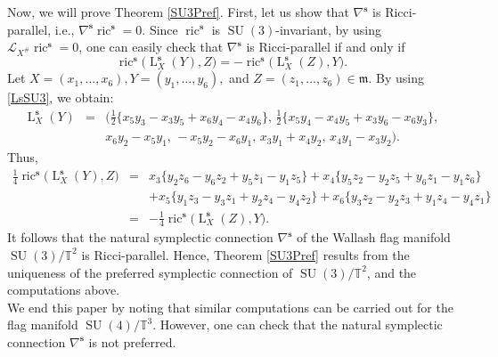 \documentclass[preprint,12pt,1p]{elsarticle}
\theoremstyle{plain}
\theoremstyle{definition}
\newcommand{\n}{\nabla}
\newcommand{\ns}{\n^\mathbf{s}}
\newcommand{\ls}{\operatorname{L}^\mathbf{s}}
\newcommand{\ric}{\operatorname{ric}}
\numberwithin{equation}{section}
\newcommand{\SU}{\operatorname{SU}}
\begin{document}
Now, we will prove Theorem \ref{SU3Pref}. First, let us show that $\ns$ is Ricci-parallel, i.e., $\ns\ric^\mathbf{s}=0$. Since $\ric^\mathbf{s}$ is $\SU(3)$-invariant, by using $\mathcal{L}_{X^\#}\ric^\mathbf{s}=0$, one can easily check that $\ns$ is Ricci-parallel if and only if
\begin{equation*}\label{PerfSU3-2-}
\ric^\mathbf{s}\big(\ls_X(Y),Z\big)=-\ric^\mathbf{s}\big(\ls_X(Z),Y\big).
\end{equation*}
Let $X=(x_1,\ldots,x_6),Y=(y_1,\ldots,y_6),$ and $Z=(z_1,\ldots,z_6)\in\mathfrak{m}$. By using \eqref{LsSU3}, we obtain:
\begin{eqnarray*}
\ls_X(Y)&=&\Big(\tfrac{1}{2}\big\{x_5y_3-x_3y_5+x_6y_4-x_4y_6\big\},\,\tfrac{1}{2}\big\{x_5y_4-x_4y_5+x_3y_6-x_6y_3\big\},\\
&&x_6y_2-x_5y_1,\,-x_5y_2-x_6y_1,\,x_3y_1+x_4y_2,\,x_4y_1-x_3y_2\Big).
\end{eqnarray*}
Thus,
\begin{eqnarray*}
\tfrac{1}{4}\ric^\mathbf{s}\big(\ls_X(Y),Z\big)&=&x_3\big\{y_2z_6-y_6z_2+y_5z_1-y_1z_5\big\}+x_4\big\{y_5z_2-y_2z_5+y_6z_1-y_1z_6\big\}\\
&&+x_5\big\{y_1z_3-y_3z_1+y_2z_4-y_4z_2\big\}+x_6\big\{y_3z_2-y_2z_3+y_1z_4-y_4z_1\big\}\\
&=&-\tfrac{1}{4}\ric^\mathbf{s}\big(\ls_X(Z),Y\big).
\end{eqnarray*}
It follows that the natural symplectic connection $\ns$ of the Wallash flag manifold $\SU(3)/\mathbb{T}^2$ is Ricci-parallel. Hence, Theorem \ref{SU3Pref} results from the uniqueness of the preferred symplectic connection of $\SU(3)/\mathbb{T}^2$, and the computations above.\\


We end this paper by noting that similar computations can be carried out for the flag manifold $\SU(4)/\mathbb{T}^3$. However, one can check that the natural symplectic connection $\ns$ is not preferred.


\end{document}
